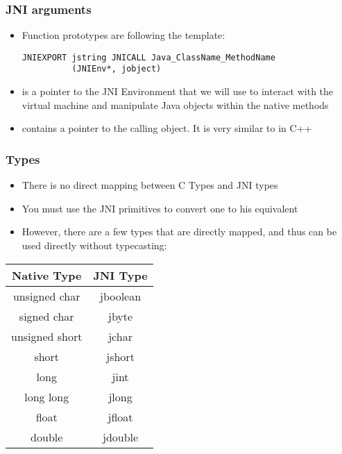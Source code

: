 \begin{frame}[fragile]
  \frametitle{JNI arguments}
  \begin{itemize}
  \item Function prototypes are following the template:
\begin{verbatim}
JNIEXPORT jstring JNICALL Java_ClassName_MethodName
          (JNIEnv*, jobject)
\end{verbatim}
  \item {} is a pointer to the JNI Environment that we will
    use to interact with the virtual machine and manipulate Java objects
    within the native methods
  \item {} contains a pointer to the calling object. It is very
    similar to  in C++
  \end{itemize}
\end{frame}

\begin{frame}
  \frametitle{Types}
  \begin{itemize}
  \item There is no direct mapping between C Types and JNI types
  \item You must use the JNI primitives to convert one to his equivalent
  \item However, there are a few types that are directly mapped, and
    thus can be used directly without typecasting:
  \end{itemize}
  \begin{center}
    \begin{tabular}{|c|c|}
      \hline
      Native Type & JNI Type\\
      \hline
      unsigned char & jboolean\\
      \hline
      signed char & jbyte\\
      \hline
      unsigned short & jchar\\
      \hline
      short & jshort\\
      \hline
      long & jint\\
      \hline
      long long & jlong\\
      \hline
      float & jfloat\\
      \hline
      double & jdouble\\
      \hline
    \end{tabular}
  \end{center}
\end{frame}

